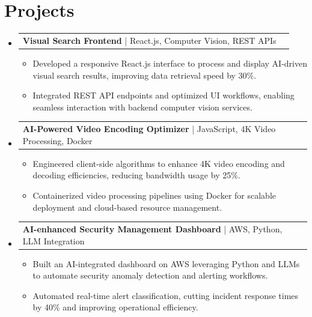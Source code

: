 \documentclass[letterpaper,11pt]{article}
\makeatletter
\newcommand{\resumeItem}[1]{
  \item\footnotesize{
    {#1 \vspace{-2pt}}
  }
}
\newcommand{\resumeProjectHeading}[2]{
    \item
    \begin{tabular*}{1.001\textwidth}{l@{\extracolsep{\fill}}r}
      \small#1 & \textbf{\small #2}\\
    \end{tabular*}\vspace{-7pt}
}
\newcommand{\resumeSubHeadingListStart}{\begin{itemize}[leftmargin=0pt, label={}]}
\newcommand{\resumeSubHeadingListEnd}{\end{itemize}}
\newcommand{\resumeItemListStart}{\begin{itemize}[leftmargin=*]}
\newcommand{\resumeItemListEnd}{\end{itemize}\vspace{-5pt}}
\makeatother
\begin{document}
\section{Projects}
    \vspace{-5pt}
    \resumeSubHeadingListStart
          \resumeProjectHeading
              {\textbf{Visual Search Frontend} | React.js, Computer Vision, REST APIs}{}
        \resumeItemListStart
            \resumeItem{Developed a responsive React.js interface to process and display AI-driven visual search results, improving data retrieval speed by 30\%.}
            \resumeItem{Integrated REST API endpoints and optimized UI workflows, enabling seamless interaction with backend computer vision services.}
        \resumeItemListEnd
        \vspace{-12pt}
    
    \resumeProjectHeading
        {\textbf{AI-Powered Video Encoding Optimizer} | JavaScript, 4K Video Processing, Docker}{}
        \resumeItemListStart
            \resumeItem{Engineered client-side algorithms to enhance 4K video encoding and decoding efficiencies, reducing bandwidth usage by 25\%.}
            \resumeItem{Containerized video processing pipelines using Docker for scalable deployment and cloud-based resource management.}
        \resumeItemListEnd
          \vspace{-12pt}
      \resumeProjectHeading
          {\textbf{AI-enhanced Security Management Dashboard} | AWS, Python, LLM Integration}{}
          \resumeItemListStart
              \resumeItem{Built an AI-integrated dashboard on AWS leveraging Python and LLMs to automate security anomaly detection and alerting workflows.}
              \resumeItem{Automated real-time alert classification, cutting incident response times by 40\% and improving operational efficiency.}
          \resumeItemListEnd 
    \resumeSubHeadingListEnd
\end{document}
